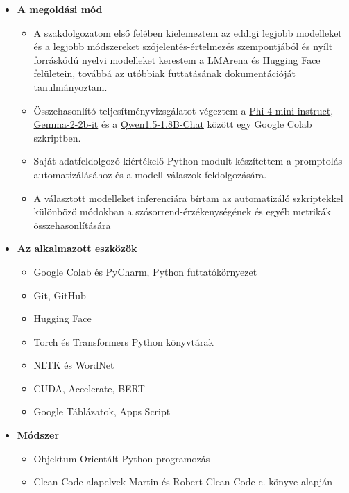 \documentclass[12pt]{report}
\theoremstyle{definition}
\begin{document}
\begin{itemize}
\item \textbf{A megoldási mód}
      \begin{itemize}
        \item
              A szakdolgozatom első felében kielemeztem az eddigi legjobb modelleket és a legjobb módszereket szójelentés-értelmezés szempontjából és nyílt forráskódú nyelvi modelleket kerestem a LMArena és Hugging Face felületein, továbbá az utóbbiak futtatásának dokumentációját tanulmányoztam.
            \item Összehasonlító teljesítményvizsgálatot végeztem a
            \href{https://huggingface.co/microsoft/Phi-4-mini-instruct}{Phi-4-mini-instruct}, \href{https://huggingface.co/google/gemma-2-2b-it}{Gemma-2-2b-it} és a \href{https://huggingface.co/Qwen/Qwen1.5-1.8B-Chat}{Qwen1.5-1.8B-Chat} között egy Google Colab szkriptben.
        \item
              Saját adatfeldolgozó kiértékelő Python modult készítettem a promptolás automatizálásához és a modell válaszok feldolgozására.
        \item A választott modelleket inferenciára bírtam az automatizáló szkriptekkel különböző módokban a szósorrend-érzékenységének és egyéb metrikák összehasonlítására

      \end{itemize}
\item \textbf{Az alkalmazott eszközök}
      \begin{itemize}

        \item Google Colab és PyCharm, Python futtatókörnyezet
        \item Git, GitHub
        \item Hugging Face
        \item Torch és Transformers Python könyvtárak
        \item NLTK és WordNet
        \item CUDA, Accelerate, BERT
        \item Google Táblázatok, Apps Script

      \end{itemize}
      \item \textbf{Módszer}
      \begin{itemize}

        \item Objektum Orientált Python programozás
        \item Clean Code alapelvek Martin és Robert Clean Code c. könyve \cite{martin2008cleancode} alapján


\end{itemize}
\end{itemize}
\end{document}
